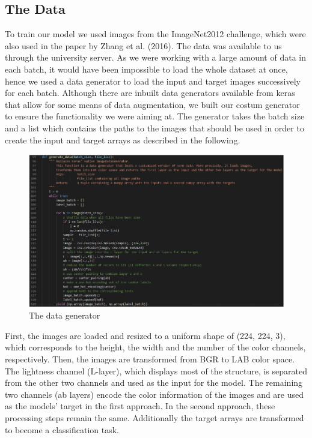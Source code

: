 \documentclass[12pt,letterpaper]{article}
\begin{document}
\subsection{The Data}
To train our model we used images from the ImageNet2012 challenge, which were also used in the paper by Zhang et al. (2016). The data was available to us through the university server. As we were working with a large amount of data in each batch, it would have been impossible to load the whole dataset at once, hence we used a data generator to load the input and target images successively for each batch. Although there are inbuilt data generators available from keras that allow for some means of data augmentation, we built our costum generator to ensure the functionality we were aiming at. The generator takes the batch size and a list which contains the paths to the images that should be used in order to create the input and target arrays as described in the following.\\
\begin{figure}[ht]
	\centering
	\includegraphics[width=1.0\textwidth]{code_datagen.png}
	\caption{The data generator}
	\label{datagen}
\end{figure}
First, the images are loaded and resized to a uniform shape of (224, 224, 3), which corresponds to the height, the width and the number of the color channels, respectively. Then, the images are transformed from BGR to LAB color space. The lightness channel (L-layer), which displays most of the structure, is separated from the other two channels and used as the input for the model.  The remaining two channels (ab layers) encode the color information of the images and are used as the models’ target in the first approach. In the second approach, these processing steps remain the same. Additionally the target arrays are transformed to become a classification task.\\
\end{document}
